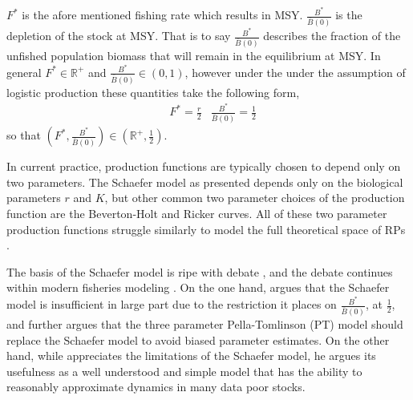 \documentclass[12pt]{article}
\begin{document}
%
$F^*$ is the afore mentioned fishing rate which results in MSY. $\frac{B^*}{\bar B(0)}$ 
is the depletion of the stock at MSY. That is to say $\frac{B^*}{\bar B(0)}$ describes 
the fraction of the unfished population biomass that will remain in the equilibrium 
at MSY. In general $F^*\in\mathbb{R}^+$ and \mbox{$\frac{B^*}{\bar B(0)}\in\left(0, 1\right)$,} 
however under the under the assumption of logistic production these 
quantities take the following form,  
%
\begin{align}
        &F^* = \frac{r}{2}
        &\frac{B^*}{\bar B(0)} = \frac{1}{2} \label{fbLogistic}
\end{align}
so that $\left(F^*, \frac{B^*}{\bar B(0)}\right)\in \left(\mathbb{R}^+, \frac{1}{2}\right)$.

%
In current practice, production functions are typically chosen to depend only 
on two parameters. The Schaefer model as presented depends only on
the biological parameters $r$ and $K$, but other common two parameter choices
of the production function are the Beverton-Holt  
and Ricker  curves. All of these two parameter 
production functions struggle similarly to model the full theoretical space of 
RPs .

The basis of the Schaefer model is ripe with debate , 
and the debate continues within modern fisheries modeling . 
On the one hand,  argues that the Schaefer model is 
insufficient in large part due to the restriction it places on $\frac{B^*}{\bar B(0)}$, 
at $\frac{1}{2}$, and further argues that the three parameter Pella-Tomlinson 
(PT) model  should replace the Schaefer model to avoid biased parameter 
estimates. On the other hand, while  appreciates 
the limitations of the Schaefer model, he argues its usefulness as a well 
understood and simple model that has the ability to reasonably 
approximate dynamics in many data poor stocks. %

%
%
%
%
\end{document}

